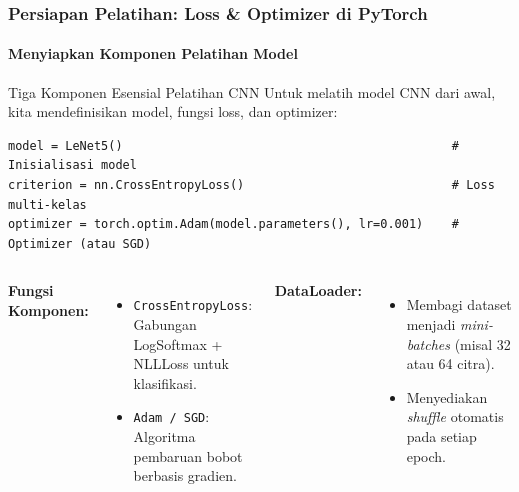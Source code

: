 \documentclass[t,aspectratio=169,xcolor=dvipsnames]{beamer}
\begin{document}
\begin{frame}[fragile]
    \frametitle{Persiapan Pelatihan: Loss \& Optimizer di PyTorch}
    \framesubtitle{Menyiapkan Komponen Pelatihan Model}
    \footnotesize

    \begin{block}{Tiga Komponen Esensial Pelatihan CNN}
        Untuk melatih model CNN dari awal, kita mendefinisikan model, fungsi loss, dan optimizer:
    \end{block}

\begin{verbatim}
model = LeNet5()                                              # Inisialisasi model
criterion = nn.CrossEntropyLoss()                             # Loss multi-kelas
optimizer = torch.optim.Adam(model.parameters(), lr=0.001)    # Optimizer (atau SGD)
\end{verbatim}

    \begin{columns}[t]
        \textbf{Fungsi Komponen:}
        \begin{itemize}
            \item \texttt{CrossEntropyLoss}: Gabungan LogSoftmax + NLLLoss untuk klasifikasi.
            \item \texttt{Adam / SGD}: Algoritma pembaruan bobot berbasis gradien.
        \end{itemize}

        \textbf{DataLoader:}
        \begin{itemize}
            \item Membagi dataset menjadi \textit{mini-batches} (misal 32 atau 64 citra).
            \item Menyediakan \textit{shuffle} otomatis pada setiap epoch.
        \end{itemize}
    \end{columns}
\end{frame}
\end{document}
